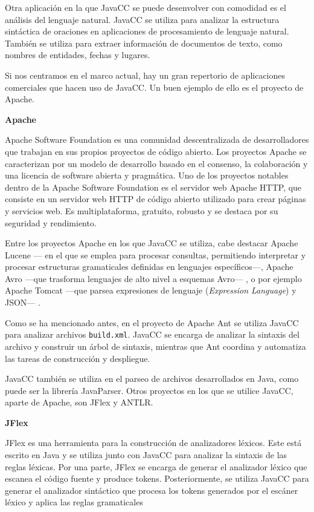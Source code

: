 Otra aplicación en la que JavaCC se puede desenvolver con comodidad es el análisis del lenguaje natural. JavaCC se utiliza para analizar la estructura sintáctica de oraciones en aplicaciones de procesamiento de lenguaje natural\cite{languageprocessing}. También se utiliza para extraer información de documentos de texto, como nombres de entidades, fechas y lugares.

Si nos centramos en el marco actual, hay un gran repertorio de aplicaciones comerciales que hacen uso de JavaCC. Un buen ejemplo de ello es el proyecto de Apache.

\textbf{Apache}

Apache Software Foundation es una comunidad descentralizada de desarrolladores que trabajan en sus propios proyectos de código abierto. Los proyectos Apache se caracterizan por un modelo de desarrollo basado en el consenso, la colaboración y una licencia de software abierta y pragmática\cite{apachepaginaoficial}. Uno de los proyectos notables dentro de la Apache Software Foundation es el servidor web Apache HTTP, que consiste en un servidor web HTTP de código abierto utilizado para crear páginas y servicios web. Es multiplataforma, gratuito, robusto y se destaca por su seguridad y rendimiento\cite{apachehttp}.

Entre los proyectos Apache en los que JavaCC se utiliza, cabe destacar Apache Lucene --- en el que se emplea para procesar consultas, permitiendo interpretar y procesar estructuras gramaticales definidas en lenguajes específicos---, Apache Avro ---que trasforma lenguajes de alto nivel a esquemas Avro--- , o por ejemplo Apache Tomcat ---que parsea expresiones de lenguaje (\textit{Expression Language})\cite{expressionlanguage} y JSON--- \cite{javaccgithub}.

Como se ha mencionado antes, en el proyecto de Apache Ant se utiliza JavaCC para analizar archivos \lstinline|build.xml|. JavaCC se encarga de analizar la sintaxis del archivo y construir un árbol de sintaxis, mientras que Ant coordina y automatiza las tareas de construcción y despliegue.

JavaCC también se utiliza en el parseo de archivos desarrollados en Java, como puede ser la librería JavaParser\cite{javaparser}. Otros proyectos en los que se utilice JavaCC, aparte de Apache, son JFlex y ANTLR.

\textbf{JFlex}

JFlex es una herramienta para la construcción de analizadores léxicos. Este está escrito en Java y se utiliza junto con JavaCC para analizar la sintaxis de las reglas léxicas. Por una parte, JFlex se encarga de generar el analizador léxico que escanea el código fuente y produce tokens. Posteriormente, se utiliza JavaCC para generar el analizador sintáctico que procesa los tokens generados por el escáner léxico y aplica las reglas gramaticales


